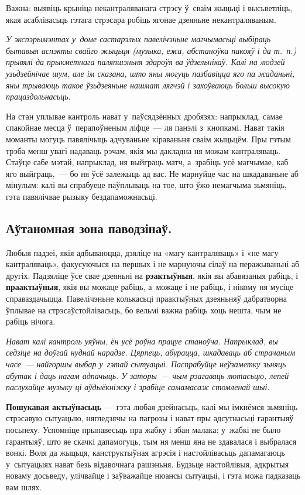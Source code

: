 Важна: выявіць крыніца некантраляванага стрэсу ў~сваім жыцьці і высьветліць, якая асаблівасьць гэтага стрэсара робіць ягонае дзеяньне некантраляваным. 

\emph{У экспэрымэнтах у~доме састарэлых павелічэньне магчымасьці выбіраць бытавыя аспэкты свайго жыцьця (музыка, ежа, абстаноўка пакояў і да т.~п.) прывялі да прыкметнага паляпшэньня здароўя ва ўдзельнікаў. Калі на людзей узьдзейнічае шум, але ім сказана, што яны могуць пазбавіцца яго па жаданьні, яны трываюць такое ўзьдзеяньне нашмат лягчэй і захоўваюць больш высокую працаздольнасьць.}

На стан уплывае кантроль нават у~паўсядзённых дробязях: напрыклад, самае спакойнае месца ў~перапоўненым ліфце~--- ля панэлі з~кнопкамі. Нават такія моманты могуць павялічыць адчуваньне кіраваньня сваім жыцьцём. Пры гэтым трэба менш увагі надаваць рэчам, якія мы дакладна ня можам кантраляваць. Стаўце сабе мэтай, напрыклад, ня выйграць матч, а~зрабіць усё магчымае, каб яго выйграць,~--- бо ня ўсё залежыць ад вас. Не марнуйце час на шкадаваньне аб мінулым: калі вы спрабуеце паўплываць на тое, што ўжо немагчыма зьмяніць, гэта павялічвае рызыку бездапаможнасьці.

\subsection*{Аўтаномная зона паводзінаў.}

Любыя падзеі, якія адбываюцца, дзяліце на «магу кантраляваць» і «не магу кантраляваць», факусуючыся на першых і не марнуючы сілаў на перажываньні аб другіх. Падзяліце ўсе свае дзеяньні на \textbf{рэактыўныя}, якія вы абавязаныя рабіць, і \textbf{праактыўныя}, якія вы можаце рабіць, а~можаце і не рабіць, і нікому ня мусіце справаздачыцца. Павелічэньне колькасьці праактыўных дзеяньняў дабратворна ўплывае на стрэсаўстойлівасьць, бо вельмі важна рабіць хоць нешта, чым не рабіць нічога.

\emph{Нават калі кантроль уяўны, ён усё роўна працуе станоўча. Напрыклад, вы седзіце на доўгай нуднай нарадзе. Цярпець, абурацца, шкадаваць аб страчаным часе~--- найгоршы выбар у~гэтай сытуацыі. Паспрабуйце неўзаметку зьняць абутак і даць нагам адпачыць. У заторы~--- чым рэагаваць лютасьцю, лепей паслухайце музыку ці аўдыёкніжку і зрабіце самамасаж стомленай шыі.}

\textbf{Пошукавая актыўнасьць}~--- гэта любая дзейнасьць, калі мы імкнёмся зьмяніць стрэсавую сытуацыю, нягледзячы на пагрозы і нават пры адсутнасьці гарантыяў посьпеху. Успомніце прыпавесьць пра жабку і збан малака: у~жабкі не было гарантыяў, што яе скачкі дапамогуць, тым ня менш яна не здавалася і выбралася вонкі. Воля да жыцьця, канструктыўная агрэсія і настойлівасьць дапамагаюць у~сытуацыях нават безь відавочнага рашэньня. Будзьце настойлівыя, адкрытыя новаму досьведу, улічвайце і заўважайце нюансы сытуацыі, і гэта можа падказаць вам шлях. 

